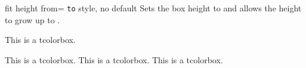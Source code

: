  
\begin{docTcbKey}{fit height from}{= \texttt{to} }{style, no default}
  Sets the box height to  and allows the height to grow up to .
\begin{dispExample}

\begin{mybox}
This is a tcolorbox.
\end{mybox}
\begin{mybox}
This is a tcolorbox. This is a tcolorbox. This is a tcolorbox.
\end{mybox}
\begin{mybox}
\lipsum[2]
\end{mybox}
\end{dispExample}
\end{docTcbKey}

